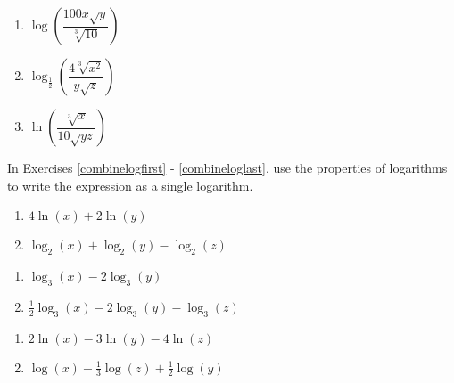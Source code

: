 \begin{multicols}{3}
\begin{enumerate}
\setcounter{enumi}{\value{HW}}

\item $\log\left(\dfrac{100x\sqrt{y}}{\sqrt[3]{10}}\right)$ 
\item $\log_{\frac{1}{2}}\left(\dfrac{4\sqrt[3]{x^2}}{y\sqrt{z}}\right)$
\item $\ln \left(\dfrac{\sqrt[3]{x}}{10 \sqrt{yz}}\right)$  \label{expandloglast}

\setcounter{HW}{\value{enumi}}
\end{enumerate}
\end{multicols}

In Exercises \ref{combinelogfirst} - \ref{combineloglast}, use the properties of logarithms to write the expression as a single logarithm.

\begin{multicols}{2}
\begin{enumerate}
\setcounter{enumi}{\value{HW}}

\item $4\ln(x) + 2\ln(y)$ \label{combinelogfirst}
\item $\log_{2}(x) + \log_{2}(y) - \log_{2}(z)$

\setcounter{HW}{\value{enumi}}
\end{enumerate}
\end{multicols}

\begin{multicols}{2}
\begin{enumerate}
\setcounter{enumi}{\value{HW}}

\item $\log_{3}(x) - 2 \log_{3}(y)$
\item $\frac{1}{2}\log_{3}(x) - 2\log_{3}(y) - \log_{3}(z)$

\setcounter{HW}{\value{enumi}}
\end{enumerate}
\end{multicols}

\begin{multicols}{2}
\begin{enumerate}
\setcounter{enumi}{\value{HW}}
\item $2 \ln(x) -3 \ln(y) - 4\ln(z)$
\item $\log(x) - \frac{1}{3} \log(z) + \frac{1}{2} \log(y)$

\setcounter{HW}{\value{enumi}}
\end{enumerate}
\end{multicols}

